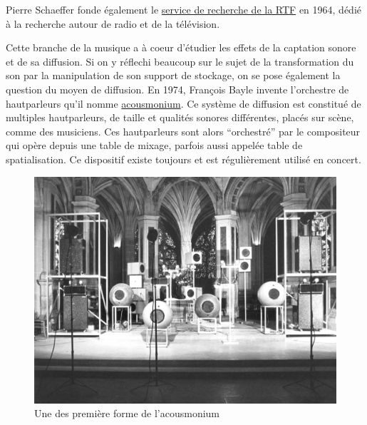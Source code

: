 \documentclass[
  letterpaper,
  DIV=11,
  numbers=noendperiod]{scrreprt}
\begin{document}
\begin{tcolorbox}[enhanced jigsaw, leftrule=.75mm, arc=.35mm, bottomtitle=1mm, colback=white, colbacktitle=quarto-callout-note-color!10!white, opacityback=0, left=2mm, rightrule=.15mm, opacitybacktitle=0.6, breakable, toptitle=1mm, titlerule=0mm, bottomrule=.15mm, toprule=.15mm, coltitle=black, title=\textcolor{quarto-callout-note-color}{\faInfo}\hspace{0.5em}{Note}]

Pierre Schaeffer fonde également le
\href{https://fr.m.wikipedia.org/wiki/Service_de_la_recherche_de_la_RTF}{service
de recherche de la RTF} en 1964, dédié à la recherche autour de radio et
de la télévision.

\end{tcolorbox}

Cette branche de la musique a à coeur d'étudier les effets de la
captation sonore et de sa diffusion. Si on y réflechi beaucoup sur le
sujet de la transformation du son par la manipulation de son support de
stockage, on se pose également la question du moyen de diffusion. En
1974, François Bayle invente l'orchestre de hautparleurs qu'il nomme
\href{https://inagrm.com/fr/showcase/news/202/lacousmonium}{acousmonium}.
Ce système de diffusion est constitué de multiples hautparleurs, de
taille et qualités sonores différentes, placés sur scène, comme des
musiciens. Ces hautparleurs sont alors ``orchestré'' par le compositeur
qui opère depuis une table de mixage, parfois aussi appelée table de
spatialisation. Ce dispositif existe toujours et est régulièrement
utilisé en concert.

\begin{figure}

{\centering \includegraphics{spatialisation/../_resources/bitmap/various/acousmonium-74.png}

}

\caption{Une des première forme de l'acousmonium}

\end{figure}
\end{document}
